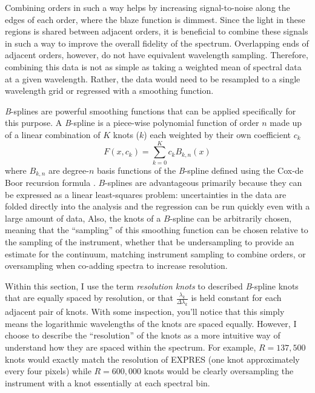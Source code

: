 Combining orders in such a way helps by increasing signal-to-noise along the edges of each order, where the blaze function is dimmest. Since the light in these regions is shared between adjacent orders, it is beneficial to combine these signals in such a way to improve the overall fidelity of the spectrum. Overlapping ends of adjacent orders, however, do not have equivalent wavelength sampling. Therefore, combining this data is not as simple as taking a weighted mean of spectral data at a given wavelength. Rather, the data would need to be resampled to a single wavelength grid \citep{anglada-escude_harps-terra_2012} or regressed with a smoothing function.

\textit{B}-splines \citep{de_boor_practical_1978, dierckx_curve_1995, eilers_flexible_1996} are powerful smoothing functions that can be applied specifically for this purpose. A \textit{B}-spline is a piece-wise polynomial function of order $n$ made up of a linear combination of $K$ knots ($k$) each weighted by their own coefficient $c_k$
\begin{equation}
    F(x,{c_k}) = \sum_{k=0}^{K} {c_k B_{k,n}(x)}
\end{equation}
where $B_{k,n}$ are degree-$n$ basis functions of the \textit{B}-spline defined using the Cox-de Boor recursion formula \citep{de_boor_practical_1978}. $B$-splines are advantageous primarily because they can be expressed as a linear least-squares problem: uncertainties in the data are folded directly into the analysis and the regression can be run quickly even with a large amount of data, Also, the knots of a $B$-spline can be arbitrarily chosen, meaning that the ``sampling'' of this smoothing function can be chosen relative to the sampling of the instrument, whether that be undersampling to provide an estimate for the continuum, matching instrument sampling to combine orders, or oversampling when co-adding spectra to increase resolution.

Within this section, I use the term \textit{resolution knots} to described \textit{B}-spline knots that are equally spaced by resolution, or that $\frac{\lambda_k}{\Delta \lambda_k}$ is held constant for each adjacent pair of knots. With some inspection, you'll notice that this simply means the logarithmic wavelengths of the knots are spaced equally. However, I choose to describe the ``resolution'' of the knots as a more intuitive way of understand how they are spaced within the spectrum. For example, $R=137,500$ knots would exactly match the resolution of EXPRES (one knot approximately every four pixels) while $R=600,000$ knots would be clearly oversampling the instrument with a knot essentially at each spectral bin.

